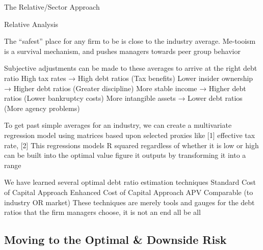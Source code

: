 \documentclass[10pt]{article}
\begin{document}
    \begin{core}{The Relative/Sector Approach}

      Relative Analysis

      The “safest” place for any firm to be is close to the industry average. Me-tooism is a survival mechanism, and pushes managers towards peer group behavior

      Subjective adjustments can be made to these averages to arrive at the right debt ratio
      High tax rates → High debt ratios (Tax benefits)
      Lower insider ownership → Higher debt ratios (Greater discipline)
      More stable income → Higher debt ratios (Lower bankruptcy costs)
      More intangible assets → Lower debt ratios (More agency problems)

      To get past simple averages for an industry, we can create a multivariate regression model using matrices based upon selected proxies like [1] effective tax rate, [2] %
      This regressions models R squared regardless of whether it is low or high can be built into the optimal value figure it outputs by transforming it into a range

    \end{core}

     We have learned several optimal debt ratio estimation techniques
    Standard Cost of Capital Approach
    Enhanced Cost of Capital Approach
    APV
    Comparable (to industry OR market)
    These techniques are merely tools and gauges for the debt ratios that the firm managers choose, it is not an end all be all

  \subsection{Moving to the Optimal \& Downside Risk}
\end{document}
